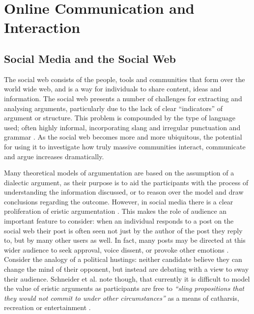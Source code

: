 \section{Online Communication and Interaction}
\label{background:online}

\subsection{Social Media and the Social Web}
\label{background:online:social}
The social web consists of the people, tools and communities that form over the world wide web, and is a way for individuals to share content, ideas and information. The social web presents a number of challenges for extracting and analysing arguments, particularly due to the lack of clear ``indicators'' of argument or structure. This problem is compounded by the type of language used; often highly informal, incorporating slang and irregular punctuation and grammar \citep{Schneider2012}. As the social web becomes more and more ubiquitous, the potential for using it to investigate how truly massive communities interact, communicate and argue increases dramatically.

Many theoretical models of argumentation are based on the assumption of a dialectic argument, as their purpose is to aid the participants with the process of understanding the information discussed, or to reason over the model and draw conclusions regarding the outcome. However, in social media there is a clear proliferation of eristic argumentation \citep{sood2012automatic}. This makes the role of audience an important feature to consider: when an individual responds to a post on the social web their post is often seen not just by the author of the post they reply to, but by many other users as well. In fact, many posts may be directed at this wider audience to seek approval, voice dissent, or provoke other emotions \citep{berland2010students}. Consider the analogy of a political hustings: neither candidate believe they can change the mind of their opponent, but instead are debating with a view to sway their audience. Schneider et al. note though, that currently it is difficult to model the value of eristic arguments as participants are free to \textit{``sling propositions that they would not commit to under other circumstances''} as a means of catharsis, recreation or entertainment \citep{Schneider2014}.


